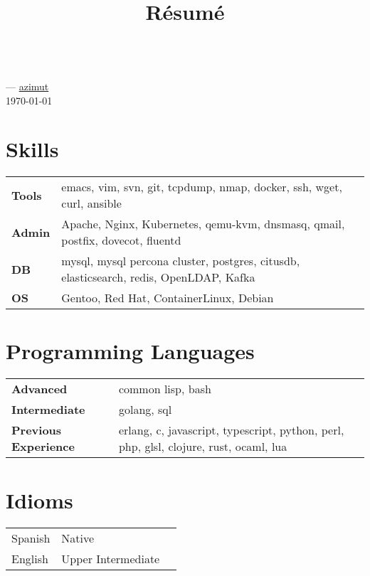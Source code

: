 \documentclass[11pt]{article}
\renewcommand{\maketitle}{
  \begin{center}{\huge\bfseries\theauthor} \\
    \vspace{.25em}
    {\faEnvelope} \href {mailto:\MAILTO} {\expandafter\randomize\expandafter{\MAILTO}}
    ---
    {\faGithub} \href {https://github.com/azimut} {azimut} \\
    \vspace{.25em}
    \today
  \end{center}
}
\begin{document}
\title{R\'esum\'e}
\author{\FULLNAME}

\maketitle

\section{Skills}


\begin{tabular}{@{}lll@{}}
  \hspace{.1em} \textbf{Tools} & emacs, vim, svn, git, tcpdump, nmap, docker, ssh, wget, curl, ansible \\
  \hspace{.1em} \textbf{Admin} & Apache, Nginx, Kubernetes, qemu-kvm, dnsmasq, qmail, postfix, dovecot, fluentd \\
  \hspace{.1em} \textbf{DB}    & mysql, mysql percona cluster, postgres, citusdb, elasticsearch, redis, OpenLDAP, Kafka \\
  \hspace{.1em} \textbf{OS}    & Gentoo, Red Hat, ContainerLinux, Debian \\
\end{tabular}


\section{Programming Languages}


\begin{tabular}{@{}lll@{}}
  \hspace{.1em} \textbf{Advanced} & common lisp, bash \\
  \hspace{.1em} \textbf{Intermediate} & golang, sql \\
  \hspace{.1em} \textbf{Previous Experience} & erlang, c, javascript, typescript, python, perl, php, glsl, clojure, rust, ocaml, lua \\
\end{tabular}


\section{Idioms}


\begin{tabular}{@{}lll@{}}
  \hspace{.1em} Spanish & Native \\
  \hspace{.1em} English & Upper Intermediate
  \\
\end{tabular}
\end{document}
